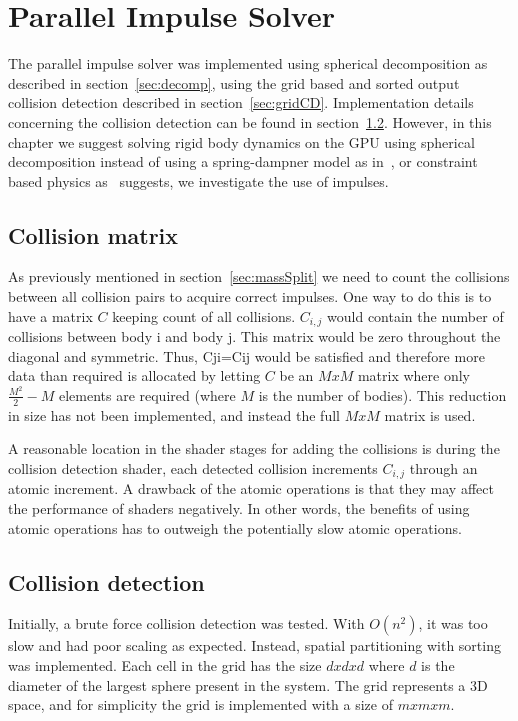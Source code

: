 \chapter{Parallel Impulse Solver}\label{cha:impl}
The parallel impulse solver was implemented using spherical decomposition as
 described in section~\ref{sec:decomp}, using the grid based and sorted output
 collision detection described in section~\ref{sec:gridCD}. Implementation details
 concerning the collision detection can be found in section~\ref{sec:implcd}.
However, in this chapter we suggest solving rigid body dynamics on the GPU using spherical
decomposition instead of using a spring-dampner model as in~\cite{gpugems}, or constraint
based physics as~\cite{flex} suggests, we investigate the use of impulses.


\section{Collision matrix}\label{sec:colMatrix}
As previously mentioned in section~\ref{sec:massSplit} we need to count the collisions
between all collision pairs to acquire correct impulses. One way to do
this is to have a matrix $C$ keeping count of all collisions. $C_{i,j}$ would
contain the number of collisions between body i and body j. This matrix would be
zero throughout the diagonal and symmetric. Thus, Cji=Cij would be satisfied and
therefore more data than required is allocated by letting $C$
be an $MxM$ matrix where only $\frac{M^2}{2}-M$ elements are required (where $M$ is the
number of bodies). This reduction in size
has not been implemented, and instead the full $MxM$ matrix is used.

A reasonable location in the shader stages for adding the collisions is during
the collision detection shader, each detected collision increments $C_{i,j}$
 through an atomic increment. A drawback of the atomic
 operations is that they may affect the performance of shaders negatively. In
 other words, the benefits of using atomic operations has to outweigh the potentially
 slow atomic operations.

\section{Collision detection}\label{sec:implcd}
Initially, a brute force collision detection was tested. With $O(n^2)$, it was too
slow and had poor scaling as expected. Instead, spatial partitioning with sorting
was implemented.
Each cell in the grid has the size $d x d x d$ where $d$ is the diameter of the largest sphere
present in the system. The grid represents a 3D space, and for simplicity the grid is
implemented with a size of $mxmxm$.

